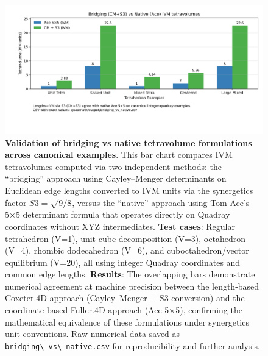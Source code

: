 \documentclass[
  10pt,
]{article}
\newcommand{\passthrough}[1]{#1}
\begin{document}
\begin{figure}
\centering
\includegraphics{../output/figures/bridging_vs_native.png}
\caption{\textbf{Validation of bridging vs native tetravolume
formulations across canonical examples}. This bar chart compares IVM
tetravolumes computed via two independent methods: the ``bridging''
approach using Cayley--Menger determinants on Euclidean edge lengths
converted to IVM units via the synergetics factor \(S3=\sqrt{9/8}\),
versus the ``native'' approach using Tom Ace's 5×5 determinant formula
that operates directly on Quadray coordinates without XYZ intermediates.
\textbf{Test cases}: Regular tetrahedron (V=1), unit cube decomposition
(V=3), octahedron (V=4), rhombic dodecahedron (V=6), and
cuboctahedron/vector equilibrium (V=20), all using integer Quadray
coordinates and common edge lengths. \textbf{Results}: The overlapping
bars demonstrate numerical agreement at machine precision between the
length-based Coxeter.4D approach (Cayley--Menger + S3 conversion) and
the coordinate-based Fuller.4D approach (Ace 5×5), confirming the
mathematical equivalence of these formulations under synergetics unit
conventions. Raw numerical data saved as
\passthrough{\lstinline!bridging\_vs\_native.csv!} for reproducibility
and further analysis.}
\end{figure}
\end{document}
